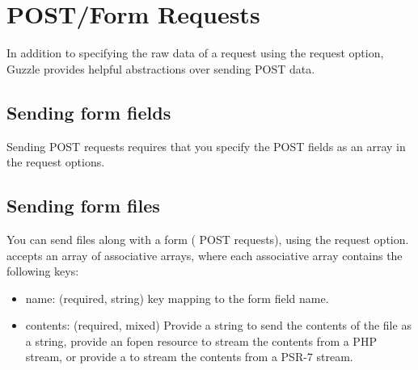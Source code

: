 \documentclass[a4paper,11pt,spanish]{sphinxmanual}
\begin{document}
\section{POST/Form Requests}
\label{\detokenize{quickstart:post-form-requests}}
In addition to specifying the raw data of a request using the  request
option, Guzzle provides helpful abstractions over sending POST data.


\subsection{Sending form fields}
\label{\detokenize{quickstart:sending-form-fields}}
Sending  POST requests requires that you
specify the POST fields as an array in the  request options.

\begin{sphinxVerbatim}[commandchars=\\\{\}]
    \PYG{p}{[}
      \PYG{p}{[}
          
          
          \PYG{p}{[}
              
        \PYG{p}{]}
    \PYG{p}{]}
\PYG{p}{]);}
\end{sphinxVerbatim}


\subsection{Sending form files}
\label{\detokenize{quickstart:sending-form-files}}
You can send files along with a form ( POST requests),
using the  request option.  accepts an array of
associative arrays, where each associative array contains the following keys:
\begin{itemize}
\item {} 
name: (required, string) key mapping to the form field name.

\item {} 
contents: (required, mixed) Provide a string to send the contents of the
file as a string, provide an fopen resource to stream the contents from a
PHP stream, or provide a  to stream
the contents from a PSR-7 stream.

\end{itemize}
\end{document}
